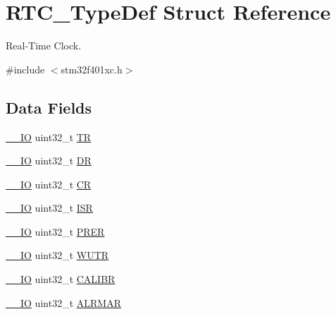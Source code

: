\hypertarget{struct_r_t_c___type_def}{}\section{R\+T\+C\+\_\+\+Type\+Def Struct Reference}
\label{struct_r_t_c___type_def}


Real-\/\+Time Clock.  




{\ttfamily \#include $<$stm32f401xc.\+h$>$}

\subsection*{Data Fields}
\begin{DoxyCompactItemize}
\item 
\hyperlink{core__sc300_8h_aec43007d9998a0a0e01faede4133d6be}{\+\_\+\+\_\+\+IO} uint32\+\_\+t \hyperlink{struct_r_t_c___type_def_a63d179b7a36a715dce7203858d3be132}{TR}
\item 
\hyperlink{core__sc300_8h_aec43007d9998a0a0e01faede4133d6be}{\+\_\+\+\_\+\+IO} uint32\+\_\+t \hyperlink{struct_r_t_c___type_def_a3df0d8dfcd1ec958659ffe21eb64fa94}{DR}
\item 
\hyperlink{core__sc300_8h_aec43007d9998a0a0e01faede4133d6be}{\+\_\+\+\_\+\+IO} uint32\+\_\+t \hyperlink{struct_r_t_c___type_def_ab40c89c59391aaa9d9a8ec011dd0907a}{CR}
\item 
\hyperlink{core__sc300_8h_aec43007d9998a0a0e01faede4133d6be}{\+\_\+\+\_\+\+IO} uint32\+\_\+t \hyperlink{struct_r_t_c___type_def_ab3c49a96815fcbee63d95e1e74f20e75}{I\+SR}
\item 
\hyperlink{core__sc300_8h_aec43007d9998a0a0e01faede4133d6be}{\+\_\+\+\_\+\+IO} uint32\+\_\+t \hyperlink{struct_r_t_c___type_def_ac9b4c6c5b29f3461ce3f875eea69f35b}{P\+R\+ER}
\item 
\hyperlink{core__sc300_8h_aec43007d9998a0a0e01faede4133d6be}{\+\_\+\+\_\+\+IO} uint32\+\_\+t \hyperlink{struct_r_t_c___type_def_ac5b3c8be61045a304d3076d4714d29f2}{W\+U\+TR}
\item 
\hyperlink{core__sc300_8h_aec43007d9998a0a0e01faede4133d6be}{\+\_\+\+\_\+\+IO} uint32\+\_\+t \hyperlink{struct_r_t_c___type_def_ab97f3e9584dda705dc10a5f4c5f6e636}{C\+A\+L\+I\+BR}
\item 
\hyperlink{core__sc300_8h_aec43007d9998a0a0e01faede4133d6be}{\+\_\+\+\_\+\+IO} uint32\+\_\+t \hyperlink{struct_r_t_c___type_def_ac005b1a5bc52634d5a34578cc9d2c3f6}{A\+L\+R\+M\+AR}
\item 

\end{DoxyCompactItemize}
